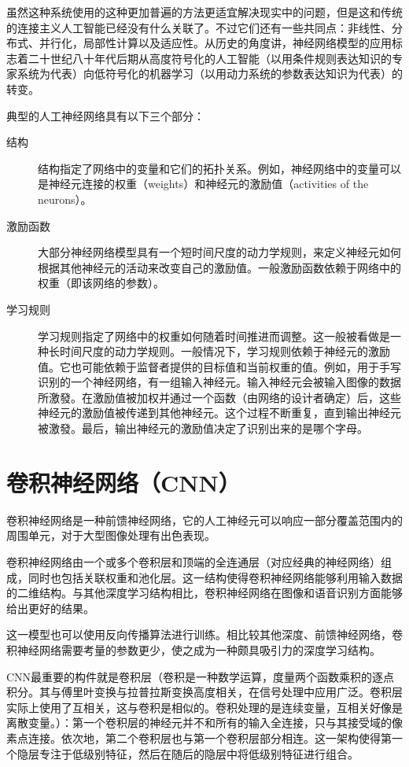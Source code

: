 \documentclass[UTF8]{ctexart}
\begin{document}
虽然这种系统使用的这种更加普遍的方法更适宜解决现实中的问题，但是这和传统的连接主义人工智能已经没有什么关联了。不过它们还有一些共同点：非线性、分布式、并行化，局部性计算以及适应性。从历史的角度讲，神经网络模型的应用标志着二十世纪八十年代后期从高度符号化的人工智能（以用条件规则表达知识的专家系统为代表）向低符号化的机器学习（以用动力系统的参数表达知识为代表）的转变。

典型的人工神经网络具有以下三个部分：
\begin{description}
    \item[结构]结构指定了网络中的变量和它们的拓扑关系。例如，神经网络中的变量可以是神经元连接的权重（weights）和神经元的激励值（activities of the neurons）。
    \item[激励函数]大部分神经网络模型具有一个短时间尺度的动力学规则，来定义神经元如何根据其他神经元的活动来改变自己的激励值。一般激励函数依赖于网络中的权重（即该网络的参数）。
    \item[学习规则]  学习规则指定了网络中的权重如何随着时间推进而调整。这一般被看做是一种长时间尺度的动力学规则。一般情况下，学习规则依赖于神经元的激励值。它也可能依赖于监督者提供的目标值和当前权重的值。例如，用于手写识别的一个神经网络，有一组输入神经元。输入神经元会被输入图像的数据所激發。在激励值被加权并通过一个函数（由网络的设计者确定）后，这些神经元的激励值被传递到其他神经元。这个过程不断重复，直到输出神经元被激發。最后，输出神经元的激励值决定了识别出来的是哪个字母。
\end{description}
\section{卷积神经网络（CNN）}
卷积神经网络是一种前馈神经网络，它的人工神经元可以响应一部分覆盖范围内的周围单元，对于大型图像处理有出色表现。

卷积神经网络由一个或多个卷积层和顶端的全连通层（对应经典的神经网络）组成，同时也包括关联权重和池化层。这一结构使得卷积神经网络能够利用输入数据的二维结构。与其他深度学习结构相比，卷积神经网络在图像和语音识别方面能够给出更好的结果。

这一模型也可以使用反向传播算法进行训练。相比较其他深度、前馈神经网络，卷积神经网络需要考量的参数更少，使之成为一种颇具吸引力的深度学习结构。

CNN最重要的构件就是卷积层（卷积是一种数学运算，度量两个函数乘积的逐点积分。其与傅里叶变换与拉普拉斯变换高度相关，在信号处理中应用广泛。卷积层实际上使用了互相关，这与卷积是相似的。卷积处理的是连续变量，互相关好像是离散变量。）：第一个卷积层的神经元并不和所有的输入全连接，只与其接受域的像素点连接。依次地，第二个卷积层也与第一个卷积层部分相连。这一架构使得第一个隐层专注于低级别特征，然后在随后的隐层中将低级别特征进行组合。
\end{document}
